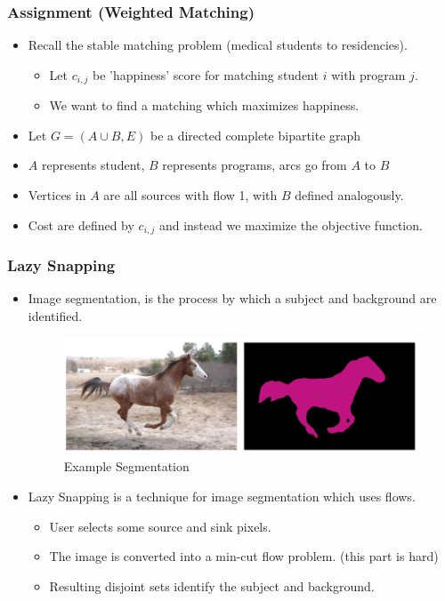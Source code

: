 \documentclass{beamer}
\begin{document}
	\begin{frame}
		\frametitle{Assignment (Weighted Matching)}
		\begin{itemize}
			\item Recall the stable matching problem (medical students to residencies).
			\begin{itemize}
				\item Let $c_{i, j}$ be 'happiness' score for matching student $i$ with program $j$. 
				\item We want to find a matching which maximizes happiness.  
			\end{itemize}
			\item Let $G = (A \cup B, E)$ be a directed complete bipartite graph
			\item $A$ represents student, $B$ represents programs, arcs go from $A$ to $B$
			\item Vertices in $A$ are all sources with flow 1, with $B$ defined analogously. 
			\item Cost are defined by $c_{i, j}$ and instead we maximize the objective function. 
			\vfill
		\end{itemize}		
	\end{frame}



	\begin{frame}
		\frametitle{Lazy Snapping}
		\begin{itemize}
			\item Image segmentation, is the process by which a subject and background are identified. 
			\begin{figure}
				\caption{Example Segmentation}
				\begin{center}
					\includegraphics[width = .65\textwidth]{segmentation.png}
				\end{center}
				\end{figure}
				\vfill
			\item Lazy Snapping is a technique for image segmentation which uses flows.
			\begin{itemize}
				\item User selects some source and sink pixels.
				\item The image is converted into a min-cut flow problem. (this part is hard)
				\item Resulting disjoint sets identify the subject and background.  
			\end{itemize} 
			\end{itemize}
	\end{frame}
\end{document}
